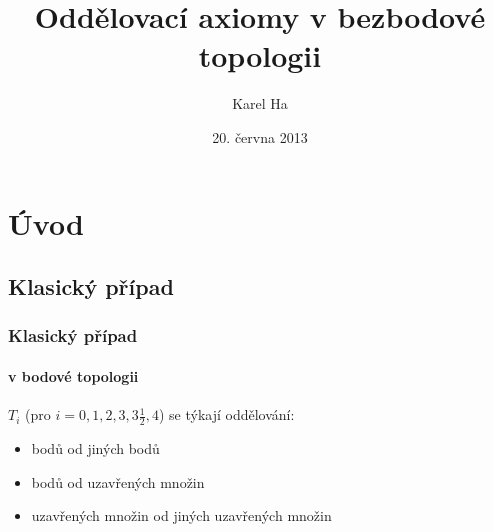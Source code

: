 \documentclass[mathserif]{beamer}
\title[Oddělovací axiomy]{Oddělovací axiomy v bezbodové topologii} %
\author{Karel Ha} %
\institute[MFF UK] %
{
Matematicko-fyzikální fakulta, \\
Univerzita Karlova v Praze \\ %
}
\date{20. června 2013} %
\begin{document}
\begin{frame}
\titlepage %
\end{frame}



\section{Úvod} %

\subsection{Klasický případ}

\begin{frame}
\frametitle{Klasický případ}
\framesubtitle{v bodové topologii}
\pause

{\color{blue}{Oddělovací axiomy} $T_i$} (pro $i = 0, 1, 2, 3, 3\frac{1}{2}, 4$)
se týkají oddělování:
\pause

\begin{itemize}[<+->]
  \item bodů od jiných bodů
  \item bodů od uzavřených množin
  \item uzavřených množin od jiných uzavřených množin
\end{itemize}

\end{frame}
\end{document}
